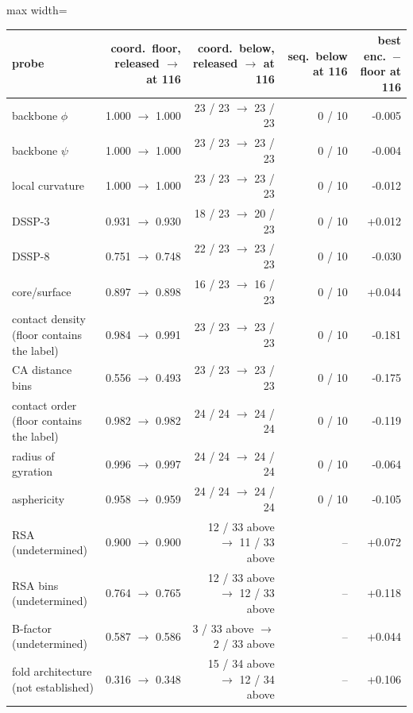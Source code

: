 \begin{adjustbox}{max width=\linewidth}
\begin{tabular}{lrrrr}
\toprule
\rowcolor{CompassLavender!32}
probe & coord.\ floor, released $\to$ at 116 & coord.\ below, released $\to$ at 116 & seq.\ below at 116 & best enc.\ $-$ floor at 116 \\
\midrule
backbone $\phi$ & 1.000 $\to$ 1.000 & 23 / 23 $\to$ 23 / 23 & 0 / 10 & -0.005 \\
backbone $\psi$ & 1.000 $\to$ 1.000 & 23 / 23 $\to$ 23 / 23 & 0 / 10 & -0.004 \\
local curvature & 1.000 $\to$ 1.000 & 23 / 23 $\to$ 23 / 23 & 0 / 10 & -0.012 \\
DSSP-3 & 0.931 $\to$ 0.930 & 18 / 23 $\to$ 20 / 23 & 0 / 10 & +0.012 \\
DSSP-8 & 0.751 $\to$ 0.748 & 22 / 23 $\to$ 23 / 23 & 0 / 10 & -0.030 \\
core/surface & 0.897 $\to$ 0.898 & 16 / 23 $\to$ 16 / 23 & 0 / 10 & +0.044 \\
contact density (floor contains the label) & 0.984 $\to$ 0.991 & 23 / 23 $\to$ 23 / 23 & 0 / 10 & -0.181 \\
CA distance bins & 0.556 $\to$ 0.493 & 23 / 23 $\to$ 23 / 23 & 0 / 10 & -0.175 \\
contact order (floor contains the label) & 0.982 $\to$ 0.982 & 24 / 24 $\to$ 24 / 24 & 0 / 10 & -0.119 \\
radius of gyration & 0.996 $\to$ 0.997 & 24 / 24 $\to$ 24 / 24 & 0 / 10 & -0.064 \\
asphericity & 0.958 $\to$ 0.959 & 24 / 24 $\to$ 24 / 24 & 0 / 10 & -0.105 \\
\midrule
RSA (undetermined) & 0.900 $\to$ 0.900 & 12 / 33 above $\to$ 11 / 33 above & -- & +0.072 \\
RSA bins (undetermined) & 0.764 $\to$ 0.765 & 12 / 33 above $\to$ 12 / 33 above & -- & +0.118 \\
B-factor (undetermined) & 0.587 $\to$ 0.586 & 3 / 33 above $\to$ 2 / 33 above & -- & +0.044 \\
fold architecture (not established) & 0.316 $\to$ 0.348 & 15 / 34 above $\to$ 12 / 34 above & -- & +0.106 \\
\bottomrule
\end{tabular}
\end{adjustbox}
